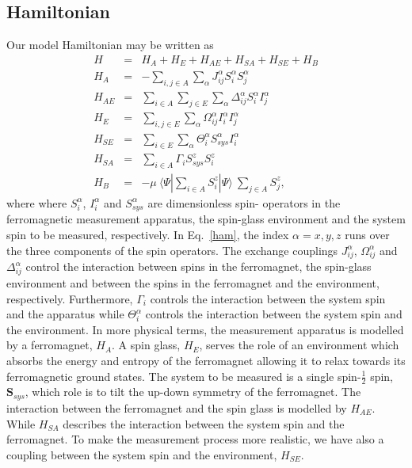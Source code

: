\documentclass[showpacs,preprintnumbers,amsmath,amssymb,12pt]{revtex4-2}
\begin{document}
\subsection{Hamiltonian}
Our model Hamiltonian may be written as
\begin{eqnarray}
  H&=&H_A+H_E+H_{AE}+H_{SA}+H_{SE}+H_B
\label{ham}
\\
H_A&=&-\sum\limits_{i,j\in A}
\sum\limits_{\alpha}J_{ij}^{\alpha}S_i^{\alpha}S_j^{\alpha} \nonumber \\
H_{AE}&=&\sum\limits_{i\in A}\sum\limits_{j\in E}
\sum\limits_{\alpha}\Delta_{ij}^{\alpha}S_i^{\alpha}I_j^{\alpha}\nonumber \\
H_E&=&\sum\limits_{i,j\in E}
\sum\limits_{\alpha}\Omega_{ij}^{\alpha}I_i^{\alpha}I_j^{\alpha} \nonumber\\
H_{SE}&=&\sum\limits_{i\in E} \sum\limits_{\alpha} \Theta_i^{\alpha} 
S_{sys}^{\alpha}I_i^{\alpha} \nonumber\\
H_{SA}&=&\sum\limits_{i\in A}\Gamma_i S_{sys}^{z}S_i^{z}\nonumber \\
H_{B}&=& - \mu  ~ \langle \Psi | \sum_{i \in
  A} S_i^z | \Psi \rangle ~\sum_{j \in A} S_j^z, \nonumber
\end{eqnarray}
where where $S_i^\alpha$, $I_i^\alpha$ and $S_{sys}^\alpha$ are
dimensionless spin-{\small \textonehalf} operators in the
ferromagnetic measurement apparatus, the spin-glass environment and
the system spin to be measured, respectively.  In Eq.~\eqref{ham}, the
index $\alpha = x,y,z$ runs over the three components of the spin
operators.  The exchange couplings $J_{ij}^{\alpha}$,
$\Omega_{ij}^{\alpha}$ and $\Delta_{ij}^{\alpha}$ control the
interaction between spins in the ferromagnet, the spin-glass
environment and between the spins in the ferromagnet and the
environment, respectively. Furthermore, $\Gamma_i$ controls the
interaction between the system spin and the apparatus while
$\Theta_i^\alpha$ controls the interaction between the system spin and
the environment. In more physical terms, the measurement apparatus is
modelled by a ferromagnet, $H_A$. A spin glass, $H_E$, serves the role
of an environment which absorbs the energy and entropy of the
ferromagnet allowing it to relax towards its ferromagnetic ground
states. The system to be measured is a single spin-$\frac{1}{2}$ spin,
$\boldsymbol{S}_{sys}$, which role is to tilt the up-down symmetry of
the ferromagnet.  The interaction between the ferromagnet and the spin
glass is modelled by $H_{AE}$. While $H_{SA}$ describes the
interaction between the system spin and the ferromagnet. To make the
measurement process more realistic, we have also a coupling between
the system spin and the environment, $H_{SE}$.
\end{document}
